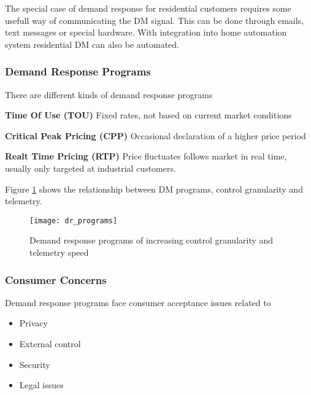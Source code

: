 The special case of demand response for residential customers requires some usefull way of communicating the DM signal.
This can be done through emails, text messages or special hardware.
With integration into home automation system residential DM can also be automated.

\subsubsection{Demand Response Programs}
There are different kinds of demand response programs

\begin{labeling}{}
    \item [\textbf{Time Of Use (TOU)}]
    Fixed rates, not based on current market conditions

    \item [\textbf{Critical Peak Pricing (CPP)}]
    Occasional declaration of a higher price period

    \item [\textbf{Realt Time Pricing (RTP)}]
    Price fluctuates follows market in real time, usually only targeted at industrial customers.

\end{labeling}

Figure \ref{fig:dr_programs} shows the relationship between DM programs, control granularity and telemetry.

\begin{figure}
    \centering
    \texttt{[image: dr\_programs]}
    \caption{Demand response programs of increasing control granularity and telemetry speed}
    \label{fig:dr_programs}
\end{figure}

\subsubsection{Consumer Concerns}
Demand response programs face consumer acceptance issues related to
\begin{itemize}
    \item Privacy
    \item External control
    \item Security
    \item Legal issues
\end{itemize}


